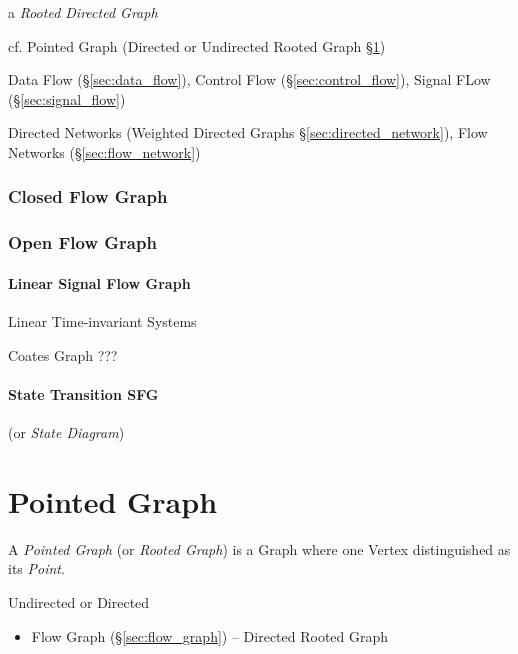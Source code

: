 a \emph{Rooted Directed Graph}

cf. Pointed Graph (Directed or Undirected Rooted Graph
\S\ref{sec:pointed_graph})

\fist Data Flow (\S\ref{sec:data_flow}), Control Flow
(\S\ref{sec:control_flow}), Signal FLow (\S\ref{sec:signal_flow})

\fist Directed Networks (Weighted Directed Graphs \S\ref{sec:directed_network}),
Flow Networks (\S\ref{sec:flow_network})



\subsubsection{Closed Flow Graph}\label{sec:closed_flowgraph}

\subsubsection{Open Flow Graph}\label{sec:open_flowgraph}

\paragraph{Linear Signal Flow Graph}\label{sec:linear_signal_flow}\hfill

Linear Time-invariant Systems

Coates Graph ??? %



\paragraph{State Transition SFG}\label{sec:state_transition_sfg}\hfill

(or \emph{State Diagram})



\section{Pointed Graph}\label{sec:pointed_graph}

A \emph{Pointed Graph} (or \emph{Rooted Graph}) is a Graph where one
Vertex distinguished as its \emph{Point}.

Undirected or Directed

\begin{itemize}
  \item Flow Graph (\S\ref{sec:flow_graph}) -- Directed Rooted Graph
\end{itemize}

